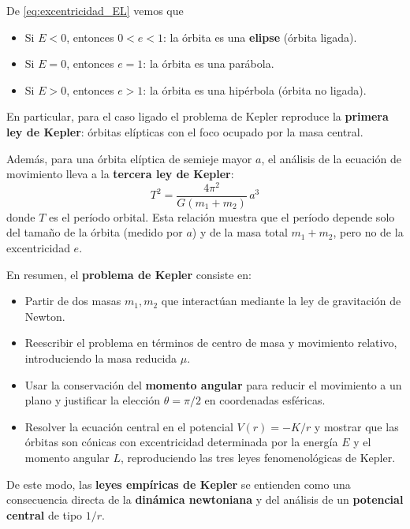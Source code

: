\documentclass{article}
\begin{document}
De \eqref{eq:excentricidad_EL} vemos que

\begin{itemize}
  \item[$\bullet$] Si \(E < 0\), entonces \(0 < e < 1\): la órbita es una
  \textcolor{Apple Green}{\textbf{elipse}} (órbita ligada).
  \item[$\bullet$] Si \(E = 0\), entonces \(e = 1\): la órbita es una parábola.
  \item[$\bullet$] Si \(E > 0\), entonces \(e > 1\): la órbita es una hipérbola
  (órbita no ligada).
\end{itemize}

En particular, para el caso ligado el problema de Kepler reproduce la
\textcolor{Tarawera}{\textbf{primera ley de Kepler}}: órbitas elípticas con el foco ocupado por
la masa central.

Además, para una órbita elíptica de semieje mayor \(a\), el análisis de la ecuación
de movimiento lleva a la \textcolor{orange(colorwheel)}{\textbf{tercera ley de Kepler}}:
\begin{equation}
\boxed{
T^{2}
= \frac{4\pi^{2}}{G(m_{1}+m_{2})}\,a^{3}
}
\label{eq:kepler_T2_a3}
\end{equation}
donde \(T\) es el período orbital. Esta relación muestra que el período depende
solo del tamaño de la órbita (medido por \(a\)) y de la masa total \(m_{1}+m_{2}\),
pero no de la excentricidad \(e\).

\vspace{0.4cm}


En resumen, el \textcolor{Tarawera}{\textbf{problema de Kepler}} consiste en:

\begin{itemize}
  \item[$\bullet$] Partir de dos masas \(m_{1},m_{2}\) que interactúan mediante
  la ley de gravitación de Newton.
  \item[$\bullet$] Reescribir el problema en términos de centro de masa y
  movimiento relativo, introduciendo la masa reducida \(\mu\).
  \item[$\bullet$] Usar la conservación del \textcolor{Apple Green}{\textbf{momento angular}} para
  reducir el movimiento a un plano y justificar la elección \(\theta=\pi/2\)
  en coordenadas esféricas.
  \item[$\bullet$] Resolver la ecuación central en el potencial
  \(\displaystyle V(r)=-K/r\) y mostrar que las órbitas son cónicas con
  excentricidad determinada por la energía \(E\) y el momento angular \(L\),
  reproduciendo las tres leyes fenomenológicas de Kepler.
\end{itemize}

De este modo, las \textcolor{Cinnabar}{\textbf{leyes empíricas de Kepler}} se entienden como una
consecuencia directa de la \textcolor{trueblue}{\textbf{dinámica newtoniana}} y del análisis de
un \textcolor{Lochinvar}{\textbf{potencial central}} de tipo \(1/r\).
\end{document}
